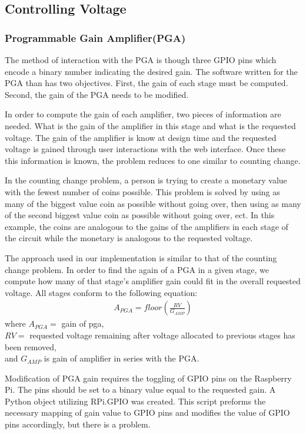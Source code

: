 \documentclass{article}	%
\begin{document}
\begin{multicols}{2}
\subsection{Controlling Voltage}
\subsubsection{Programmable Gain Amplifier(PGA)}
The method of interaction with the PGA
is though three GPIO pins which encode
a binary number indicating the desired gain.
The software written for the PGA than
has two objectives.
First,
the gain of each stage must be computed.
Second,
the gain of the PGA needs to be modified.

In order to compute the gain of each amplifier,
two pieces of information are needed.
What is the gain of the amplifier in this stage and
what is the requested voltage.
The gain of the amplifier is know at design time and
the requested voltage is gained through user interactions
with the web interface.
Once these this information is known,
the problem reduces to one similar to
counting change.

In the counting change problem,
a person is trying to create 
a monetary value with the fewest number
of coins possible.
This problem is solved by
using as many of the biggest value coin as
possible without going over, then
using as many of the second biggest value coin as
possible without going over, ect.
In this example,
the coins are analogous to the gains of the
amplifiers in each stage of the circuit while
the monetary is analogous to the requested voltage.

The approach used in our implementation
is similar to that of the counting change problem.
In order to find the again of a PGA in a given stage,
we compute how many of that stage's amplifier gain
could fit in the overall requested voltage.
All stages conform to the following equation:
%
\begin{gather*}
A_{PGA} = floor(\frac{RV}{G_{AMP}})
\end{gather*}
%
where $A_{PGA} =$ gain of pga,\\
$RV =$ requested voltage remaining after voltage allocated 
to previous stages has been removed,\\
and $G_{AMP}$ is gain of amplifier in series with the PGA.

Modification of PGA gain requires
the toggling of GPIO pins on the Raspberry Pi.
The pins should be set to a binary
value equal to the requested gain.
A Python object utilizing RPi.GPIO
was created.
This script preforms the
necessary mapping of gain value to GPIO pins and
modifies the value of GPIO pins accordingly, but
there is a problem.


\end{multicols}
\end{document}
